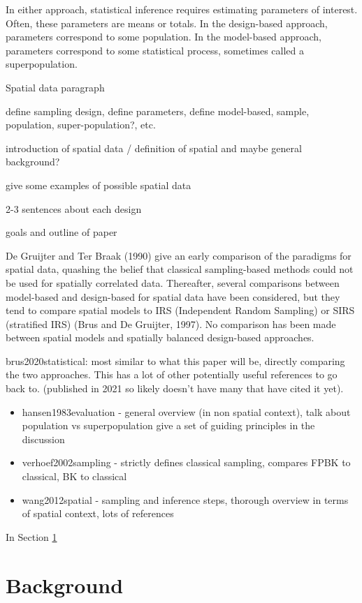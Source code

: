 \documentclass[]{elsarticle} %
\begin{document}
In either approach, statistical inference requires estimating parameters
of interest. Often, these parameters are means or totals. In the
design-based approach, parameters correspond to some population. In the
model-based approach, parameters correspond to some statistical process,
sometimes called a superpopulation.

Spatial data paragraph

define sampling design, define parameters, define model-based, sample,
population, super-population?, etc.

introduction of spatial data / definition of spatial and maybe general
background?

give some examples of possible spatial data

2-3 sentences about each design

goals and outline of paper

De Gruijter and Ter Braak (1990) give an early comparison of the
paradigms for spatial data, quashing the belief that classical
sampling-based methods could not be used for spatially correlated data.
Thereafter, several comparisons between model-based and design-based for
spatial data have been considered, but they tend to compare spatial
models to IRS (Independent Random Sampling) or SIRS (stratified IRS)
(Brus and De Gruijter, 1997). No comparison has been made between
spatial models and spatially balanced design-based approaches.

brus2020statistical: most similar to what this paper will be, directly
comparing the two approaches. This has a lot of other potentially useful
references to go back to. (published in 2021 so likely doesn't have many
that have cited it yet).

\begin{itemize}
\item
  hansen1983evaluation - general overview (in non spatial context), talk
  about population vs superpopulation give a set of guiding principles
  in the discussion
\item
  verhoef2002sampling - strictly defines classical sampling, compares
  FPBK to classical, BK to classical
\item
  wang2012spatial - sampling and inference steps, thorough overview in
  terms of spatial context, lots of references
\end{itemize}

In Section \ref{sec:background}

\hypertarget{sec:background}{%
\section{Background}\label{sec:background}}
\end{document}
